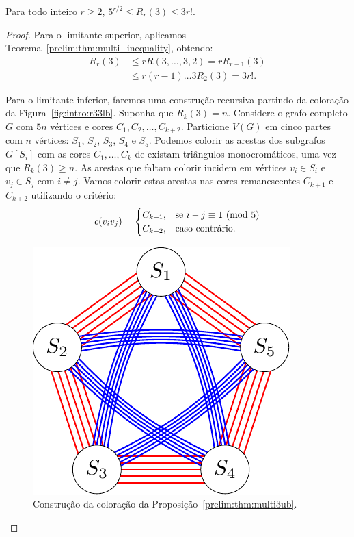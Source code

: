 \begin{theorem}
\label{prelim:thm:multi3ub} Para todo inteiro $r \geq 2$, $5^{r/2} \leq R_r(3) \leq 3 r!$.
\end{theorem}
\begin{proof}
Para o limitante superior, aplicamos Teorema~\ref{prelim:thm:multi_inequality}, obtendo:
\begin{align*}
R_{r}(3) &\leq rR(3,\dots,3,2) = rR_{r-1}(3) \\
&\leq r(r-1)\dots3 R_2(3) = 3r!.
\end{align*}

Para o limitante inferior, faremos uma construção recursiva partindo da coloração da Figura~\ref{fig:intro:r33lb}. Suponha que $R_k(3) = n$. Considere o grafo completo $G$ com $5n$ vértices e cores $C_1, C_2, \dots, C_{k+2}$. Particione $V(G)$ em cinco partes com $n$ vértices: $S_1$, $S_2$, $S_3$, $S_4$ e $S_5$.
Podemos colorir as arestas dos subgrafos $G[S_i]$ com as cores $C_1, \dots, C_k$ de existam triângulos monocromáticos, uma vez que $R_k(3) \geq n$. As arestas que faltam colorir incidem em vértices $v_i \in S_i$ e $v_j \in S_j$ com $i \neq j$. Vamos colorir estas arestas nas cores remanescentes $C_{k+1}$ e $C_{k+2}$ utilizando o critério:
\[c(v_i v_j) = \begin{cases}
  C_{k+1}, & \text{se } i - j \equiv 1 \ (\text{mod}\ 5) \\
  C_{k+2}, & \text{caso contrário}.
\end{cases}\]

\begin{figure}[H]
\centering
\includegraphics{figures/2_prelim_4_const}
\caption{Construção da coloração da Proposição~\ref{prelim:thm:multi3ub}.}
\label{prelim:fig:const}
\end{figure}



\end{proof}
